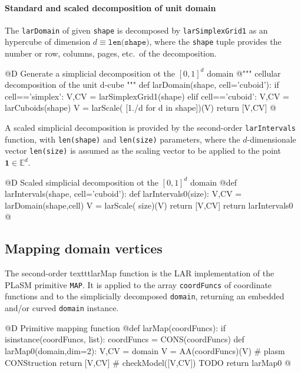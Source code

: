\documentclass[11pt,oneside]{article}    %
\def\E{\mathbb{E}}
\begin{document}
\paragraph{Standard and scaled decomposition of unit domain}
The \texttt{larDomain} of given \texttt{shape} is decomposed by \texttt{larSimplexGrid1} as an hypercube of dimension $d \equiv\texttt{len(shape)}$, where the \texttt{shape} tuple provides the number or row, columns, pages, etc.~of the decomposition.

@D Generate a simplicial decomposition ot the $[0,1]^d$ domain
@{""" cellular decomposition of the unit d-cube """
def larDomain(shape, cell='cuboid'):
    if cell=='simplex': V,CV = larSimplexGrid1(shape)
    elif cell=='cuboid': V,CV = larCuboids(shape)
    V = larScale( [1./d for d in shape])(V)
    return [V,CV]
@}

A scaled simplicial decomposition is provided by the second-order  \texttt{larIntervals} function, with \texttt{len(shape)} and \texttt{len(size)} parameters, where the $d$-dimensionale vector \texttt{len(size)} is assumed as the scaling vector to be applied to the point $\mathbf{1}\in\E^d$.

@D Scaled simplicial decomposition ot the $[0,1]^d$ domain
@{def larIntervals(shape, cell='cuboid'):
    def larIntervals0(size):
        V,CV = larDomain(shape,cell)
        V = larScale( size)(V)
        return [V,CV]
    return larIntervals0
@}

\subsection{Mapping domain vertices}
The second-order texttt{larMap} function is the LAR implementation of the PLaSM primitive \texttt{MAP}.
It is applied to the array \texttt{coordFuncs} of coordinate functions and to the simplicially decomposed  \texttt{domain}, returning an embedded and/or curved \texttt{domain} instance.

@D Primitive mapping function 
@{def larMap(coordFuncs):
    if isinstance(coordFuncs, list): coordFuncs = CONS(coordFuncs)
    def larMap0(domain,dim=2):
        V,CV = domain
        V = AA(coordFuncs)(V)  # plasm CONStruction
        return [V,CV]
        # checkModel([V,CV])  TODO
    return larMap0
@}
\end{document}
